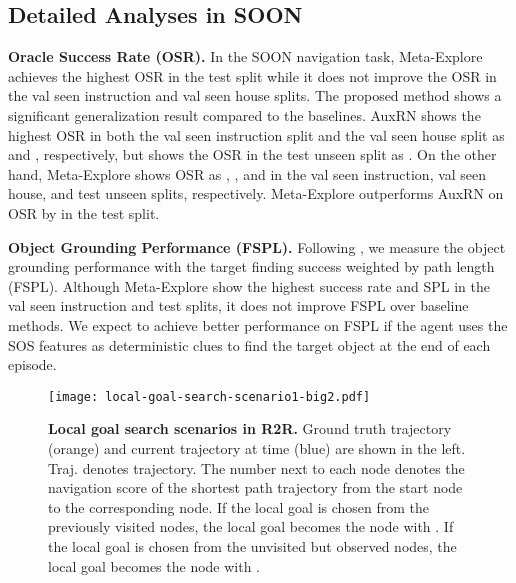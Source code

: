 \documentclass[10pt,twocolumn,letterpaper]{article}
\begin{document}
\subsection{Detailed Analyses in SOON}
\noindent\textbf{Oracle Success Rate (OSR).}
In the SOON navigation task, Meta-Explore achieves the highest OSR in the test split while it does not improve the OSR in the val seen instruction and val seen house splits. The proposed method shows a significant generalization result compared to the baselines. AuxRN shows the highest OSR in both the val seen instruction split and the val seen house split as  and , respectively, but shows the OSR in the test unseen split as . On the other hand, Meta-Explore shows OSR as , , and  in the val seen instruction, val seen house, and test unseen splits, respectively. Meta-Explore outperforms AuxRN on OSR by  in the test split. 

\noindent\textbf{Object Grounding Performance (FSPL).} 
Following \cite{zhu2021soon}, we measure the object grounding performance with the target finding success weighted by path length (FSPL). Although Meta-Explore show the highest success rate and SPL in the val seen instruction and test splits, it does not improve FSPL over baseline methods. We expect to achieve better performance on FSPL if the agent uses the SOS features as deterministic clues to find the target object at the end of each episode. 

\begin{figure*}[t!]{\centering\texttt{[image: local-goal-search-scenario1-big2.pdf]}}\centering
\caption{{\textbf{Local goal search scenarios in R2R.} Ground truth trajectory (orange) and current trajectory at time  (blue) are shown in the left. Traj. denotes trajectory. The number next to each node denotes the navigation score  of the shortest path trajectory from the start node to the corresponding node. If the local goal is chosen from the previously visited nodes, the local goal becomes the node with . If the local goal is chosen from the unvisited but observed nodes, the local goal becomes the node with .
}}\label{fig:local-goal-search-scenario1}
\end{figure*}
\end{document}
